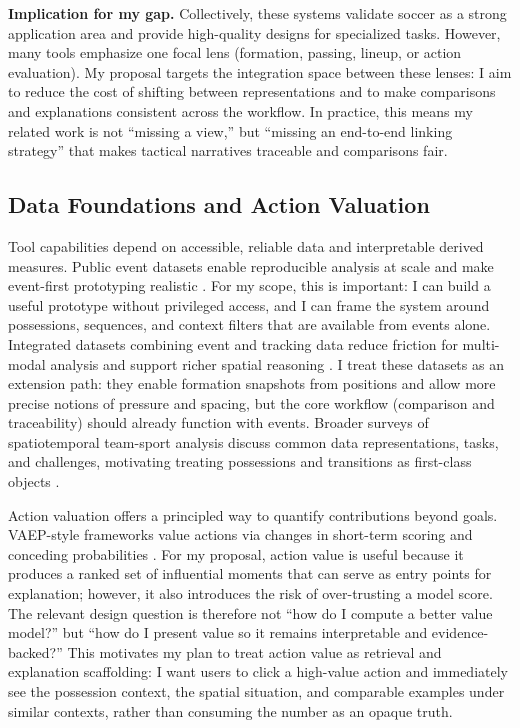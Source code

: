 \documentclass{vgtc}                          %
\begin{document}
\textbf{Implication for my gap.}
Collectively, these systems validate soccer as a strong application area and provide
high-quality designs for specialized tasks. However, many tools emphasize one focal
lens (formation, passing, lineup, or action evaluation). My proposal targets the
integration space between these lenses: I aim to reduce the cost of shifting between
representations and to make comparisons and explanations consistent across the workflow.
In practice, this means my related work is not ``missing a view,'' but ``missing an
end-to-end linking strategy'' that makes tactical narratives traceable and comparisons fair.

\subsection{Data Foundations and Action Valuation}
Tool capabilities depend on accessible, reliable data and interpretable derived measures.
Public event datasets enable reproducible analysis at scale and make event-first prototyping
realistic \cite{Pappalardo2019SoccerLogs}. For my scope, this is important: I can build a
useful prototype without privileged access, and I can frame the system around possessions,
sequences, and context filters that are available from events alone. Integrated datasets
combining event and tracking data reduce friction for multi-modal analysis and support richer
spatial reasoning \cite{Bassek2025BundesligaDataset}. I treat these datasets as an extension
path: they enable formation snapshots from positions and allow more precise notions of
pressure and spacing, but the core workflow (comparison and traceability) should already
function with events. Broader surveys of spatiotemporal team-sport analysis discuss common data
representations, tasks, and challenges, motivating treating possessions and transitions as
first-class objects \cite{Gudmundsson2017SpatioTemporal,Rein2021SportsData}.

Action valuation offers a principled way to quantify contributions beyond goals. VAEP-style
frameworks value actions via changes in short-term scoring and conceding probabilities
\cite{Decroos2018VAEP,Decroos2020VAEP_IJCAI}. For my proposal, action value is useful because it
produces a ranked set of influential moments that can serve as entry points for explanation;
however, it also introduces the risk of over-trusting a model score. The relevant design
question is therefore not ``how do I compute a better value model?'' but ``how do I present
value so it remains interpretable and evidence-backed?'' This motivates my plan to treat action
value as retrieval and explanation scaffolding: I want users to click a high-value action and
immediately see the possession context, the spatial situation, and comparable examples under
similar contexts, rather than consuming the number as an opaque truth.
\end{document}
